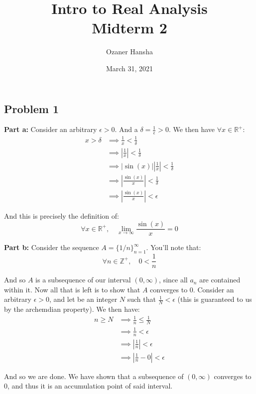 \documentclass{article}
\newcommand{\R}{\mathbb R}
\newcommand{\Z}{\mathbb Z}
\begin{document}
\title{Intro to Real Analysis\\Midterm 2}
\author{Ozaner Hansha}
\date{March 31, 2021}
\maketitle

\subsection*{Problem 1}
\noindent\textbf{Part a:} Consider an arbitrary $\epsilon>0$. And a $\delta=\frac{1}{\epsilon}>0$. We then have $\forall x\in\R^+$:
\begin{align*}
  x>\delta&\implies\frac{1}{x}<\frac{1}{\delta}\tag{$1/x$ is strictly decreasing over $\R^+$}\\
  &\implies\left|\frac{1}{x}\right|<\frac{1}{\delta}\tag{$x>0\implies 1/x>0$}\\
  &\implies|\sin(x)|\left|\frac{1}{x}\right|<\frac{1}{\delta}\tag{$|\sin(x)|\le 1$}\\
  &\implies\left|\frac{\sin(x)}{x}\right|<\frac{1}{\delta}\\
  &\implies\left|\frac{\sin(x)}{x}\right|<\epsilon\tag{def. of $\delta$}
\end{align*}

And this is precisely the definition of:
$$\forall x\in\R^+,\quad\lim_{x\to\infty}\frac{\sin(x)}{x}=0$$
\bigskip

\noindent\textbf{Part b:} Consider the sequence $A=\{1/n\}_{n=1}^\infty$. You'll note that:
$$\forall n\in\Z^+,\quad 0<\frac{1}{n}$$

And so $A$ is a subsequence of our interval $(0,\infty)$, since all $a_n$ are contained within it. Now all that is left is to show that $A$ converges to 0. Consider an arbitrary $\epsilon>0$, and let be an integer $N$ such that $\frac{1}{N}<\epsilon$ (this is guaranteed to us by the archemdian property). We then have:
\begin{align*}
  n\ge N&\implies\frac{1}{n}\le\frac{1}{N}\tag{$1/x$ is strictly decreasing over $\R^+$}\\
  &\implies\frac{1}{n}<\epsilon\tag{def. of $N$}\\
  &\implies\left|\frac{1}{n}\right|<\epsilon\tag{$n>0\implies 1/n>0$}\\
  &\implies\left|\frac{1}{n}-0\right|<\epsilon
\end{align*}

And so we are done. We have shown that a subsequence of $(0,\infty)$ converges to 0, and thus it is an accumulation point of said interval.
\bigskip
\end{document}

